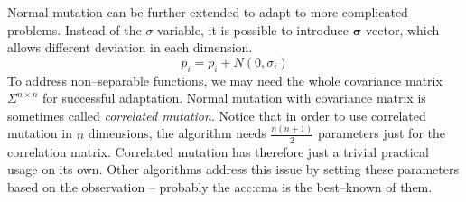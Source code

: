 Normal mutation can be further extended to adapt to more complicated problems. Instead of the $\sigma$ variable, it is possible to introduce $\boldsymbol{\sigma}$ vector, which allows different deviation in each dimension.
$$
p_i = p_i + N(0,\sigma_i)
$$ 
To address non--separable functions, we may need the whole covariance matrix $\Sigma^{n \times n}$ for successful adaptation. Normal mutation with covariance matrix is sometimes called \emph{correlated mutation}. Notice that in order to use correlated mutation in $n$ dimensions, the algorithm needs $\frac{n\left(n+1\right)}{2}$ parameters just for the correlation matrix. Correlated mutation has therefore just a trivial practical usage on its own. Other algorithms address this issue by setting these parameters based on the observation -- probably the \acrfull{acc:cma} is the best--known of them.

